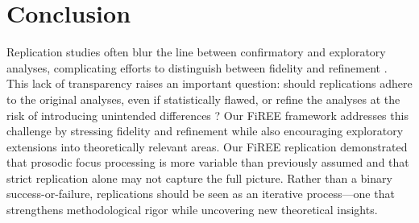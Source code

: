 \section{Conclusion}
Replication studies often blur the line between confirmatory and exploratory analyses, complicating efforts to distinguish between fidelity and refinement \parencite{Yanai2020}. This lack of transparency raises an important question: should replications adhere to the original analyses, even if statistically flawed, or refine the analyses at the risk of introducing unintended differences \cite{mcmanus2022replication}? Our FiREE framework addresses this challenge by stressing fidelity and refinement while also encouraging exploratory extensions into theoretically relevant areas. Our FiREE replication demonstrated that prosodic focus processing is more variable than previously assumed and that strict replication alone may not capture the full picture. Rather than a binary success-or-failure, replications should be seen as an iterative process—one that strengthens methodological rigor while uncovering new theoretical insights.